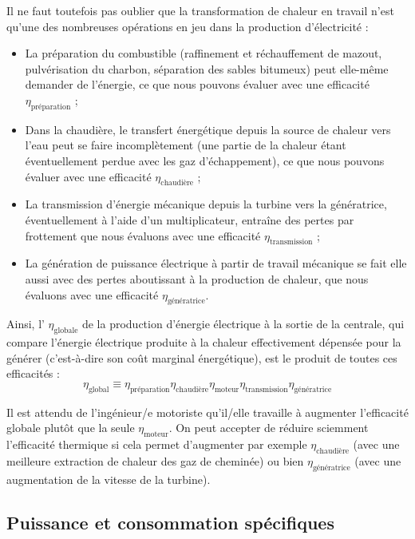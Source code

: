 		Il ne faut toutefois pas oublier que la transformation de chaleur en travail n’est qu’une des nombreuses opérations en jeu dans la production d’électricité :
		\begin{itemize}
			\item La préparation du combustible (raffinement et réchauffement de mazout, pulvérisation du charbon, séparation des sables bitumeux) peut elle-même demander de l’énergie, ce que nous pouvons évaluer avec une efficacité $\eta_\text{préparation}$ ;
			\item Dans la chaudière, le transfert énergétique depuis la source de chaleur vers l’eau peut se faire incomplètement (une partie de la chaleur étant éventuellement perdue avec les gaz d’échappement), ce que nous pouvons évaluer avec une efficacité $\eta_\text{chaudière}$ ;
			\item La transmission d’énergie mécanique depuis la turbine vers la génératrice, éventuellement à l’aide d’un multiplicateur, entraîne des pertes par frottement que nous évaluons avec une efficacité $\eta_\text{transmission}$ ;
			\item La génération de puissance électrique à partir de travail mécanique se fait elle aussi avec des pertes aboutissant à la production de chaleur, que nous évaluons avec une efficacité $\eta_\text{génératrice}$.
		\end{itemize}
		
		Ainsi, l’ $\eta_\text{globale}$ de la production d’énergie électrique à la sortie de la centrale, qui compare l’énergie électrique produite à la chaleur effectivement dépensée pour la générer (c’est-à-dire son coût marginal énergétique), est le produit de toutes ces efficacités :
		\begin{equation}
			\eta_\text{global} \equiv \eta_\text{préparation} \eta_\text{chaudière} \eta_\text{moteur} \eta_\text{transmission} \eta_\text{génératrice}
		\end{equation}
		
		Il est attendu de l’ingénieur/e motoriste qu’il/elle travaille à augmenter l’efficacité globale plutôt que la seule $\eta_\text{moteur}$. On peut accepter de réduire sciemment l’efficacité thermique si cela permet d’augmenter par exemple $\eta_\text{chaudière}$ (avec une meilleure extraction de chaleur des gaz de cheminée) ou bien $\eta_\text{génératrice}$ (avec une augmentation de la vitesse de la turbine).

	\subsection{Puissance et consommation spécifiques}
	\label{ch_SSC}
		
